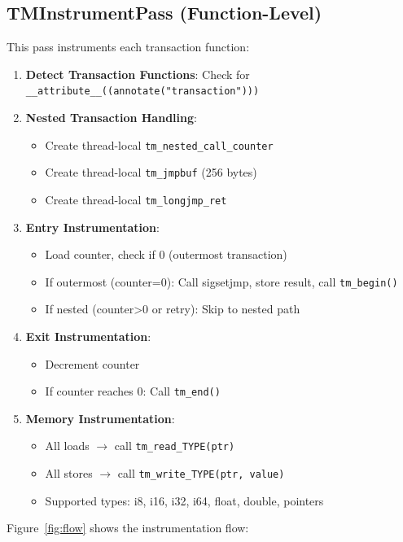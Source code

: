\documentclass[article,12pt]{article}
\begin{document}
\subsection{TMInstrumentPass (Function-Level)}

This pass instruments each transaction function:

\begin{enumerate}
\item \textbf{Detect Transaction Functions}: Check for \texttt{\_\_attribute\_\_((annotate("transaction")))}
\item \textbf{Nested Transaction Handling}:
  \begin{itemize}
  \item Create thread-local \texttt{tm\_nested\_call\_counter}
  \item Create thread-local \texttt{tm\_jmpbuf} (256 bytes)
  \item Create thread-local \texttt{tm\_longjmp\_ret}
  \end{itemize}
\item \textbf{Entry Instrumentation}:
  \begin{itemize}
  \item Load counter, check if 0 (outermost transaction)
  \item If outermost (counter=0): Call sigsetjmp, store result, call \texttt{tm\_begin()}
  \item If nested (counter>0 or retry): Skip to nested path
  \end{itemize}
\item \textbf{Exit Instrumentation}:
  \begin{itemize}
  \item Decrement counter
  \item If counter reaches 0: Call \texttt{tm\_end()}
  \end{itemize}
\item \textbf{Memory Instrumentation}:
  \begin{itemize}
  \item All loads $\rightarrow$ call \texttt{tm\_read\_TYPE(ptr)}
  \item All stores $\rightarrow$ call \texttt{tm\_write\_TYPE(ptr, value)}
  \item Supported types: i8, i16, i32, i64, float, double, pointers
  \end{itemize}
\end{enumerate}

Figure~\ref{fig:flow} shows the instrumentation flow:
\end{document}
